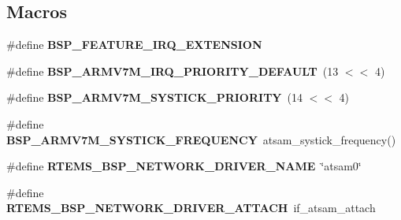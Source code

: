 \subsection*{Macros}
\begin{DoxyCompactItemize}
\item 
\mbox{\label{group__RTEMSBSPsARMAtsam_ga5d7d631d3a14b7554160f14eb42f351b}} 
\#define {\bfseries B\+S\+P\+\_\+\+F\+E\+A\+T\+U\+R\+E\+\_\+\+I\+R\+Q\+\_\+\+E\+X\+T\+E\+N\+S\+I\+ON}
\item 
\mbox{\label{group__RTEMSBSPsARMAtsam_ga8cbce037173a026946db0e4628939104}} 
\#define {\bfseries B\+S\+P\+\_\+\+A\+R\+M\+V7\+M\+\_\+\+I\+R\+Q\+\_\+\+P\+R\+I\+O\+R\+I\+T\+Y\+\_\+\+D\+E\+F\+A\+U\+LT}~(13 $<$$<$ 4)
\item 
\mbox{\label{group__RTEMSBSPsARMAtsam_gaabc09d01f675047eb59c49fc7282017d}} 
\#define {\bfseries B\+S\+P\+\_\+\+A\+R\+M\+V7\+M\+\_\+\+S\+Y\+S\+T\+I\+C\+K\+\_\+\+P\+R\+I\+O\+R\+I\+TY}~(14 $<$$<$ 4)
\item 
\mbox{\label{group__RTEMSBSPsARMAtsam_ga484f5ed3be718d51567e87bcbca4783f}} 
\#define {\bfseries B\+S\+P\+\_\+\+A\+R\+M\+V7\+M\+\_\+\+S\+Y\+S\+T\+I\+C\+K\+\_\+\+F\+R\+E\+Q\+U\+E\+N\+CY}~atsam\+\_\+systick\+\_\+frequency()
\item 
\mbox{\label{group__RTEMSBSPsARMAtsam_ga86d4f9aa98431100692e31068070a8df}} 
\#define {\bfseries R\+T\+E\+M\+S\+\_\+\+B\+S\+P\+\_\+\+N\+E\+T\+W\+O\+R\+K\+\_\+\+D\+R\+I\+V\+E\+R\+\_\+\+N\+A\+ME}~\char`\"{}atsam0\char`\"{}
\item 
\mbox{\label{group__RTEMSBSPsARMAtsam_gadde0d66aef9442971dde465292ac14e6}} 
\#define {\bfseries R\+T\+E\+M\+S\+\_\+\+B\+S\+P\+\_\+\+N\+E\+T\+W\+O\+R\+K\+\_\+\+D\+R\+I\+V\+E\+R\+\_\+\+A\+T\+T\+A\+CH}~if\+\_\+atsam\+\_\+attach
\end{DoxyCompactItemize}
